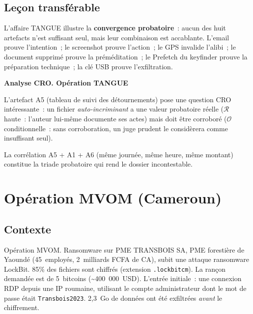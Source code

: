 \subsection{Leçon transférable}

L'affaire TANGUE illustre la \textbf{convergence probatoire}~: aucun des
huit artefacts n'est suffisant seul, mais leur combinaison est accablante.
L'email prouve l'intention~; le screenshot prouve l'action~; le GPS
invalide l'alibi~; le document supprimé prouve la préméditation~; le
Prefetch du keyfinder prouve la préparation technique~; la clé USB prouve
l'exfiltration.

\begin{boxCRO}
\textbf{Analyse CRO. Opération TANGUE}

L'artefact A5 (tableau de suivi des détournements) pose une question
CRO intéressante~: un fichier \emph{auto-incriminant} a une valeur
probatoire réelle ($\mathcal{R}$ haute~: l'auteur lui-même documente
ses actes) mais doit être corroboré ($\mathcal{O}$ conditionnelle~: sans
corroboration, un juge prudent le considèrera comme insuffisant seul).

La corrélation A5 + A1 + A6 (même journée, même heure, même montant)
constitue la triade probatoire qui rend le dossier incontestable.
\end{boxCRO}

\section{Opération MVOM (Cameroun)}
\label{sec:mvom}

\subsection{Contexte}

\begin{boxscenario}{Opération MVOM. Ransomware sur PME}
TRANSBOIS SA, PME forestière de Yaoundé (45~employés, 2~milliards FCFA
de CA), subit une attaque ransomware LockBit. 85\% des fichiers sont chiffrés
(extension \texttt{.lockbitcm}). La rançon demandée est de 5~bitcoins
(\textasciitilde 400~000~USD). L'entrée initiale~: une connexion RDP
depuis une IP roumaine, utilisant le compte administrateur dont le mot de
passe était \texttt{Transbois2023}. 2,3~Go de données ont été exfiltrées
\emph{avant} le chiffrement.
\end{boxscenario}

